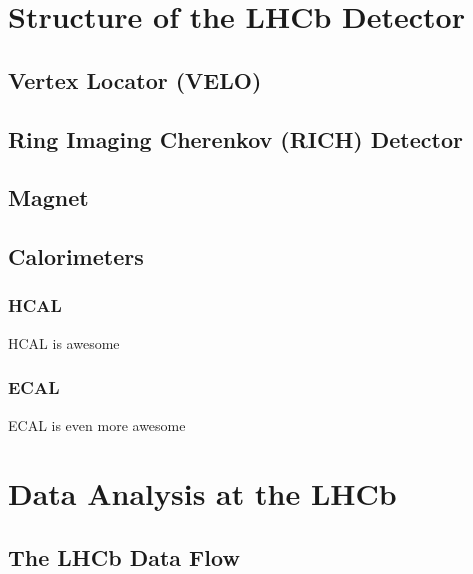 \section{Structure of the LHCb Detector}
\subsection{Vertex Locator (VELO)}
\subsection{Ring Imaging Cherenkov (RICH) Detector}
\subsection{Magnet}
\subsection{Calorimeters}
\subsubsection{HCAL}
HCAL is awesome 
\subsubsection{ECAL}
ECAL is even more awesome
\section{Data Analysis at the LHCb}
\subsection{The LHCb Data Flow}


